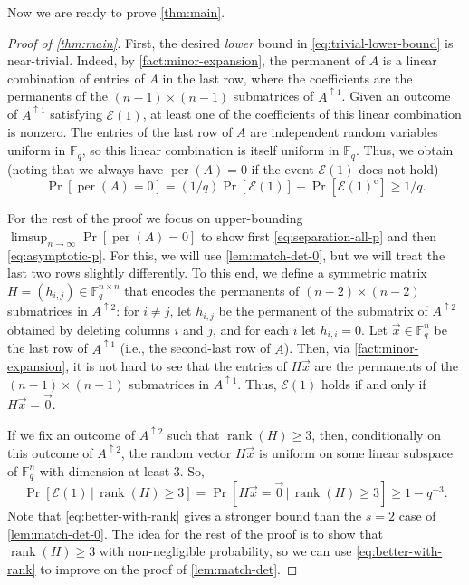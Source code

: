 \documentclass[10pt,reqno]{amsart}
\numberwithin{equation}{section}
\theoremstyle{remark}
\newcommand{\mb}{\mathbb}
\newcommand{\mc}{\mathcal}
\newcommand{\mr}{\mathrm}
\newcommand{\on}{\operatorname}
\begin{document}
Now we are ready to prove \cref{thm:main}.
\begin{proof}[Proof of \cref{thm:main}]
First, the desired \emph{lower} bound in \cref{eq:trivial-lower-bound} is near-trivial. Indeed, by \cref{fact:minor-expansion}, the permanent of $A$ is a linear combination of entries of $A$ in the last row, where the coefficients are the permanents of the $(n-1)\times (n-1)$ submatrices of $A^{\uparrow 1}$. Given an outcome of $A^{\uparrow 1}$ satisfying $\mc E(1)$, at least one of the coefficients of this linear combination is nonzero. The entries of the last row of $A$ are independent random variables uniform in $\mb F_q$, so this linear combination is itself uniform in $\mb F_q$. Thus, we obtain (noting that we always have $\on{per}(A)=0$ if the event $\mc E(1)$ does not hold) %
\[
\Pr[\on{per}(A)=0]=(1/q)\Pr[\mathcal{E}(1)]+\Pr[\mathcal{E}(1)^{\mathrm c}]\ge1/q.
\]

For the rest of the proof we focus on upper-bounding $\limsup_{n\to\infty}\Pr[\on{per}(A)=0]$ to show first \cref{eq:separation-all-p} and then \cref{eq:asymptotic-p}. For this, we will use \cref{lem:match-det-0}, but we will treat the last two rows slightly differently. To this end, we define a symmetric matrix $H=(h_{i,j})\in \mb F_q^{n\times n}$ that encodes the permanents of $(n-2)\times (n-2)$ submatrices in $A^{\uparrow2}$: for $i\ne j$, let $h_{i,j}$ be the permanent
of the submatrix of $A^{\uparrow2}$ obtained by deleting columns $i$ and $j$, and for each $i$ let $h_{i,i}=0$. Let
$\vec{x}\in\mathbb{F}_{q}^{n}$ be the last row of $A^{\uparrow 1}$ (i.e., the second-last row of $A$). Then, via \cref{fact:minor-expansion}, it is not hard to see that the entries of $H\vec{x}$ are the permanents of the $(n-1)\times(n-1)$ submatrices in $A^{\uparrow 1}$. Thus, $\mathcal{E}(1)$ holds if and only if $H\vec{x}=\vec{0}$.

If we fix an outcome of $A^{\uparrow 2}$ such that $\on{rank}(H)\ge 3$, then, conditionally on this outcome of $A^{\uparrow 2}$, the random vector $H\vec x$ is uniform on some linear subspace of $\mb F_q^n$ with dimension at least 3. So,
\begin{equation}
\Pr[\mathcal{E}(1)\,|\,\on{rank}(H)\ge 3]=\Pr[H\vec{x}=\vec{0}\,|\,\on{rank}(H)\ge 3]\ge1-q^{-3}.\label{eq:better-with-rank}  
\end{equation}
Note that \cref{eq:better-with-rank} gives a stronger bound than the $s=2$ case of \cref{lem:match-det-0}. The idea for the rest of the proof is to show that $\on{rank}(H)\ge 3$ with non-negligible probability, so we can use \cref{eq:better-with-rank} to improve on the proof of \cref{lem:match-det}.%


\end{proof}
\end{document}
